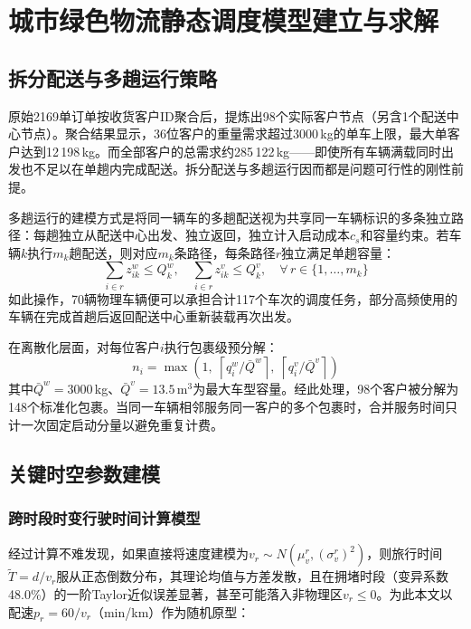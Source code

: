 \documentclass[12pt,a4paper]{article}
\begin{document}
\section{城市绿色物流静态调度模型建立与求解}

\subsection{拆分配送与多趟运行策略}

原始2169单订单按收货客户ID聚合后，提炼出98个实际客户节点（另含1个配送中心节点）。聚合结果显示，36位客户的重量需求超过3000\,kg的单车上限，最大单客户达到12\,198\,kg。而全部客户的总需求约285\,122\,kg——即使所有车辆满载同时出发也不足以在单趟内完成配送。拆分配送与多趟运行因而都是问题可行性的刚性前提。

多趟运行的建模方式是将同一辆车的多趟配送视为共享同一车辆标识的多条独立路径：每趟独立从配送中心出发、独立返回，独立计入启动成本$c_s$和容量约束。若车辆$k$执行$m_k$趟配送，则对应$m_k$条路径，每条路径$r$独立满足单趟容量：
\begin{equation}
\sum_{i \in r} z_{ik}^w \le Q_k^w, \quad \sum_{i \in r} z_{ik}^v \le Q_k^v, \quad \forall\, r \in \{1,\dots,m_k\}
\end{equation}
如此操作，70辆物理车辆便可以承担合计117个车次的调度任务，部分高频使用的车辆在完成首趟后返回配送中心重新装载再次出发。

在离散化层面，对每位客户$i$执行包裹级预分解：
\begin{equation}
n_i = \max\!\left(1,\;\left\lceil q_i^w/\bar Q^w\right\rceil,\;\left\lceil q_i^v/\bar Q^v\right\rceil\right)
\end{equation}
其中$\bar Q^w=3000$\,kg、$\bar Q^v=13.5$\,m$^3$为最大车型容量。经此处理，98个客户被分解为148个标准化包裹。当同一车辆相邻服务同一客户的多个包裹时，合并服务时间只计一次固定启动分量以避免重复计费。

\subsection{关键时空参数建模}

\subsubsection{跨时段时变行驶时间计算模型}



经过计算不难发现，如果直接将速度建模为$v_r\sim N(\mu_v^r,(\sigma_v^r)^2)$，则旅行时间$\tilde T=d/v_r$服从正态倒数分布，其理论均值与方差发散，且在拥堵时段（变异系数48.0\%）的一阶Taylor近似误差显著，甚至可能落入非物理区$v_r\le 0$。为此本文以配速$p_r=60/v_r$（min/km）作为随机原型：
\end{document}
